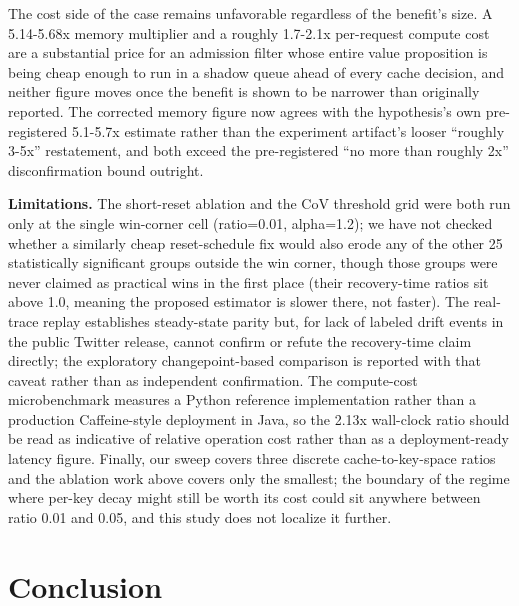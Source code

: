 \documentclass[11pt,letterpaper]{article}
\begin{document}
The cost side of the case remains unfavorable regardless of the benefit's size. A 5.14-5.68x memory multiplier and a roughly 1.7-2.1x per-request compute cost are a substantial price for an admission filter whose entire value proposition is being cheap enough to run in a shadow queue ahead of every cache decision, and neither figure moves once the benefit is shown to be narrower than originally reported. The corrected memory figure now agrees with the hypothesis's own pre-registered 5.1-5.7x estimate rather than the experiment artifact's looser ``roughly 3-5x'' restatement, and both exceed the pre-registered ``no more than roughly 2x'' disconfirmation bound outright.

\textbf{Limitations.} The short-reset ablation and the CoV threshold grid were both run only at the single win-corner cell (ratio=0.01, alpha=1.2); we have not checked whether a similarly cheap reset-schedule fix would also erode any of the other 25 statistically significant groups outside the win corner, though those groups were never claimed as practical wins in the first place (their recovery-time ratios sit above 1.0, meaning the proposed estimator is slower there, not faster). The real-trace replay establishes steady-state parity but, for lack of labeled drift events in the public Twitter release, cannot confirm or refute the recovery-time claim directly; the exploratory changepoint-based comparison is reported with that caveat rather than as independent confirmation. The compute-cost microbenchmark measures a Python reference implementation rather than a production Caffeine-style deployment in Java, so the 2.13x wall-clock ratio should be read as indicative of relative operation cost rather than as a deployment-ready latency figure. Finally, our sweep covers three discrete cache-to-key-space ratios and the ablation work above covers only the smallest; the boundary of the regime where per-key decay might still be worth its cost could sit anywhere between ratio 0.01 and 0.05, and this study does not localize it further.

\section{Conclusion}
\end{document}
